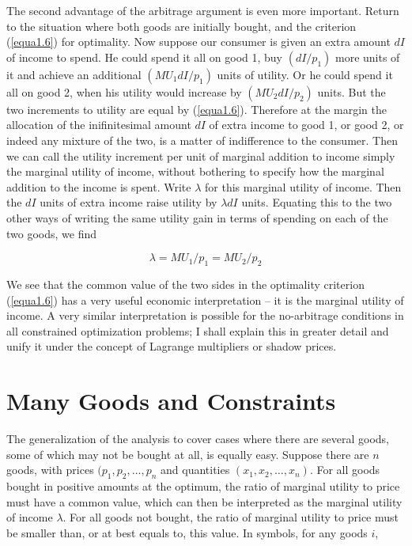 The second advantage of the arbitrage argument is even more important. Return to the situation where both goods are initially bought, and the criterion (\ref{equa1.6}) for optimality. Now suppose our consumer is given an extra amount $dI$ of income to spend. He could spend it all on good 1, buy $(dI/ p_1)$ more units of it and achieve an additional $(MU_1 dI/p_1)$ units of utility. Or he could spend it all on good 2, when his utility would increase by $(MU_2 dI / p_2)$ units. But the two increments to utility are equal by (\ref{equa1.6}). Therefore at the margin the allocation of the inifinitesimal amount $dI$ of extra income to good 1, or good 2, or indeed any mixture of the two, is a matter of indifference to the consumer. Then we can call the utility increment per unit of marginal addition to income simply the marginal utility of income, without bothering to specify how the marginal addition to the income is spent. Write $\lambda$ for this marginal utility of income. Then the $dI$ units of extra income raise utility by $\lambda dI$ units. Equating this to the two other ways of writing the same utility gain in terms of spending on each of the two goods, we find

\begin{equation}\label{equa1.9}
\lambda = MU_1 / p_1 = MU_2 / p_2
\end{equation} 

We see that the common value of the two sides in the optimality criterion (\ref{equa1.6}) has a very useful economic interpretation -- it is the marginal utility of income. A very similar interpretation is possible for the no-arbitrage conditions in all constrained optimization problems; I shall explain this in greater detail and unify it under the concept of Lagrange multipliers or shadow prices.

\section*{Many Goods and Constraints}

The generalization of the analysis to cover cases where there are several goods, some of which may not be bought at all, is equally easy. Suppose there are $n$ goods, with prices $(p_1, p_2, \dots, p_n$ and quantities $(x_1, x_2, \dots, x_n)$. For all goods bought in positive amounts at the optimum, the ratio of marginal utility to price must have a common value, which can then be interpreted as the marginal utility of income $\lambda$. For all goods not bought, the ratio of marginal utility to price must be smaller than, or at best equals to, this value. In symbols, for any goods $i$,

